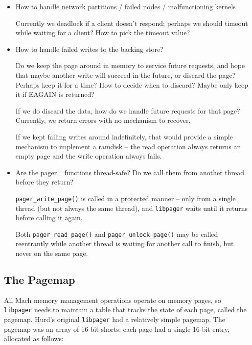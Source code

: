 \documentclass{article}
\def\libpager{{\tt libpager}\xspace}
\begin{document}
\begin{itemize}
\item How to handle network partitions / failed nodes / malfunctioning kernels

  Currently we deadlock if a client doesn't respond; perhaps we should
  timeout while waiting for a client?  How to pick the timeout value?

\item How to handle failed writes to the backing store?

  Do we keep the page around in memory to service future requests, and
  hope that maybe another write will succeed in the future, or discard
  the page?  Perhaps keep it for a time?  How to decide when to
  discard?  Maybe only keep it if EAGAIN is returned?

  If we do discard the data, how do we handle future requests for that
  page?  Currently, we return errors with no mechanism to recover.

  If we kept failing writes around indefinitely, that would provide a
  simple mechanism to implement a ramdisk -- the read operation always
  returns an empty page and the write operation always fails.

\item Are the pager_ functions thread-safe?  Do we call them from
  another thread before they return?

  {\tt pager_write_page()} is called in a protected manner -- only
  from a single thread (but not always the same thread), and \libpager
  waits until it returns before calling it again.

  Both {\tt pager_read_page()} and {\tt pager_unlock_page()} may be
  called reentrantly while another thread is waiting for another call
  to finish, but never on the same page.

\end{itemize}


\subsection{The Pagemap}

All Mach memory management operations operate on memory pages, so
\libpager needs to maintain a table that tracks the state of each
page, called the pagemap.  Hurd's original \libpager had a relatively
simple pagemap.  The pagemap was an array of 16-bit shorts; each page
had a single 16-bit entry, allocated as follows:
\end{document}

